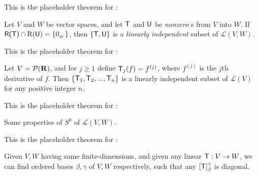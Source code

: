 \begin{additional theorem} \label{athm 2.20}
This is the placeholder theorem for :

Let \(V\) and \(W\) be vector spaces, and let \(\textsf{T}\) and \(\textsf{U}\) be \emph{nonzero} \LTRAN{}s from \(V\) into \(W\).
If \(\textsf{R(T)} \cap \mathrm{R}(\textsf{U}) = \{ 0_{_W} \}\), then
\(\{ \textsf{T}, \textsf{U} \}\) is a \emph{linearly independent} subset of \(\mathcal{L}(V, W)\).
\end{additional theorem}

\begin{additional theorem} \label{athm 2.21}
This is the placeholder theorem for :

Let \(V = \mathcal{P}(\mathbf{R})\), and for \(j \ge 1\) define \(\textsf{T}_j(f) = f^{(j)}\), where \(f^{(j)}\) is the \(j\)th derivative of \(f\).
Then \(\{ \textsf{T}_1, \textsf{T}_2, ..., \textsf{T}_n \}\) is a
linearly independent subset of \(\mathcal{L}(V)\) for any positive integer \(n\).
\end{additional theorem}

\begin{additional theorem} \label{athm 2.22}
This is the placeholder theorem for :

Some properties of \(S^0\) of \(\mathcal{L}(V, W)\).
\end{additional theorem}

\begin{additional theorem} \label{athm 2.23}
This is the placeholder theorem for :

Given \(V, W\) having same finite-dimensions, and given any linear \(\textsf{T} : V \to W\), we can find ordered bases \(\beta, \gamma\) of \(V, W\) respectively, such that any \([\textsf{T}]_{\beta}^{\gamma}\) is diagonal. 
\end{additional theorem}